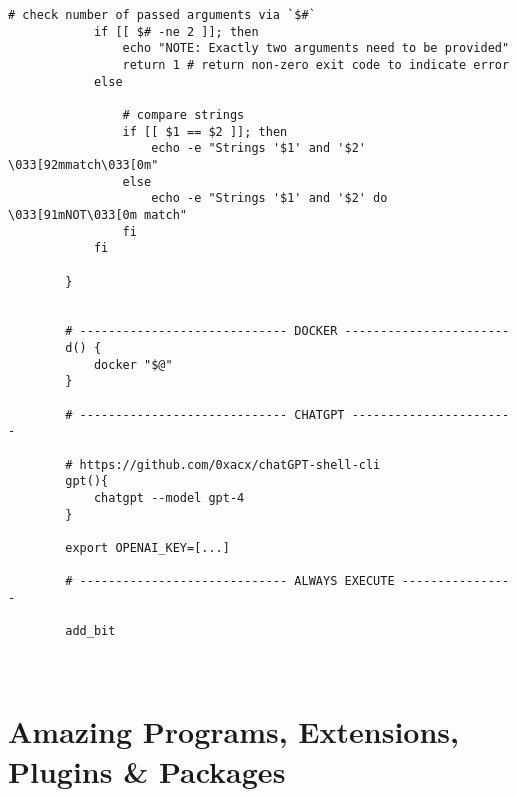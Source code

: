 \documentclass[12pt, a4paper]{article}
\numberwithin{equation}{section}
\theoremstyle{definition}
\theoremstyle{definition}
\begin{document}
\begin{lstlisting}[style=mystylebash, label=alg:bashrc_contents, caption=Contents of .bashrc file, xleftmargin=\parindent]
			# check number of passed arguments via `$#`
			if [[ $# -ne 2 ]]; then
				echo "NOTE: Exactly two arguments need to be provided"
				return 1 # return non-zero exit code to indicate error
			else
			
				# compare strings
				if [[ $1 == $2 ]]; then
					echo -e "Strings '$1' and '$2' \033[92mmatch\033[0m"
				else
					echo -e "Strings '$1' and '$2' do \033[91mNOT\033[0m match"
				fi
			fi
			
		}
		

		# ----------------------------- DOCKER -----------------------
		d() {
			docker "$@"
		}
	
		# ----------------------------- CHATGPT -----------------------

		# https://github.com/0xacx/chatGPT-shell-cli
		gpt(){
			chatgpt --model gpt-4
		}
	
		export OPENAI_KEY=[...]
	
		# ----------------------------- ALWAYS EXECUTE ----------------
		
		add_bit
		
				
	\end{lstlisting}

\newpage 

\section{Amazing Programs, Extensions, Plugins \& Packages}
\end{document}
